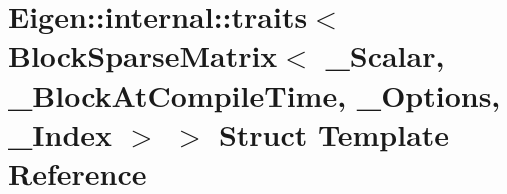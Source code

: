 \hypertarget{struct_eigen_1_1internal_1_1traits_3_01_block_sparse_matrix_3_01___scalar_00_01___block_at_compibd5ca3edcdbc62bf01222bcf3326c5bd}{}\section{Eigen\+:\+:internal\+:\+:traits$<$ Block\+Sparse\+Matrix$<$ \+\_\+\+Scalar, \+\_\+\+Block\+At\+Compile\+Time, \+\_\+\+Options, \+\_\+\+Index $>$ $>$ Struct Template Reference}
\label{struct_eigen_1_1internal_1_1traits_3_01_block_sparse_matrix_3_01___scalar_00_01___block_at_compibd5ca3edcdbc62bf01222bcf3326c5bd}
